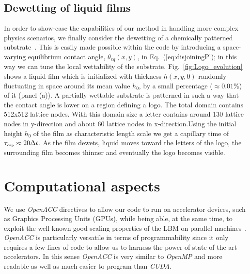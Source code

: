 \subsection{Dewetting of liquid films}
In order to show-case the capabilities of our method in handling more complex physics scenarios, we finally consider the dewetting of a chemically patterned substrate~\cite{Kargupta,Brasjen}. 
This is easily made possible within the code by introducing a space-varying equilibrium contact angle, $\theta_{eq}(x,y)$, in Eq.~(\ref{eq:disjoiningP}); in this way we can tune the local wettability of the substrate. 
Fig.~\ref{fig:Logo_evolution} shows a liquid film which is initialized with thickness $h(x,y,0)$ randomly fluctuating in space around its mean value $h_0$, by a small percentage ($\approx 0.01\%$)  of it (panel (a)). A partially wettable substrate is patterned in such a way that the contact angle is lower on a region defining a logo. The total domain contains 512x512 lattice nodes. With this domain size a letter contains around 130 lattice nodes in y-direction and about 60 lattice nodes in x-direction.Using the initial height $h_0$ of the film as characteristic length scale we get a capillary time of $\tau_{\mbox{\tiny{cap}}} \approx 20\Delta t$. As the film dewets, liquid moves toward the letters of the logo, the surrounding film becomes thinner and eventually the logo becomes visible.

\section{Computational aspects}
We use \textit{OpenACC} directives to allow our code to run on accelerator devices, such as 
Graphics Processing Units (GPUs), while being able, at the same time, to exploit the well known good scaling properties of the LBM on parallel machines~\cite{Chandrasekaran:2017:OPC:3175812}. 
\textit{OpenACC} is particularly versatile in terms of programmability since it only requires a few lines of code to allow us to harness the power of state of the art accelerators. In this sense \textit{OpenACC} is very similar to \textit{OpenMP} and more readable as well as much easier to program than \textit{CUDA}.

